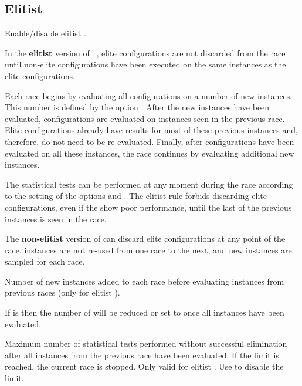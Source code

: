 \subsection[Elitist irace]{Elitist \irace}
\begin{description}
Enable/disable elitist \irace.

 In the \textbf{elitist} version of ~\citep{LopDubPerStuBir2016irace}, elite configurations are not discarded from the race until non-elite configurations have been executed on the same instances as the elite configurations.

 Each race begins by evaluating all configurations on a number of new instances. This number is defined by the option . After the new instances have been evaluated, configurations are evaluated on instances seen in the previous race.  Elite configurations already have results for most of these previous instances and, therefore, do not need to be re-evaluated. Finally, after configurations have been evaluated on all these instances, the race continues by evaluating additional new instances. 

 The statistical tests can be performed at any moment during the race according to the setting of the options  and . The elitist rule forbids discarding elite configurations, even if the show poor performance, until the last of the previous instances is seen in the race. 

 The \textbf{non-elitist} version of \irace can discard elite configurations at any point of the race, instances are not re-used from one race to the next, and new instances are sampled for each race.

 Number of new instances added to each race before evaluating instances from previous races (only for elitist \irace).
 \begin{xwarningbox}
 
 If  is  then the number of  will be reduced or set to  once all instances have been evaluated.
\end{xwarningbox}

  Maximum number of statistical tests performed without successful elimination after all instances from the previous race have been evaluated. If the limit is reached, the current race is stopped. Only valid for elitist \irace. Use  to disable the limit.

\end{description}

